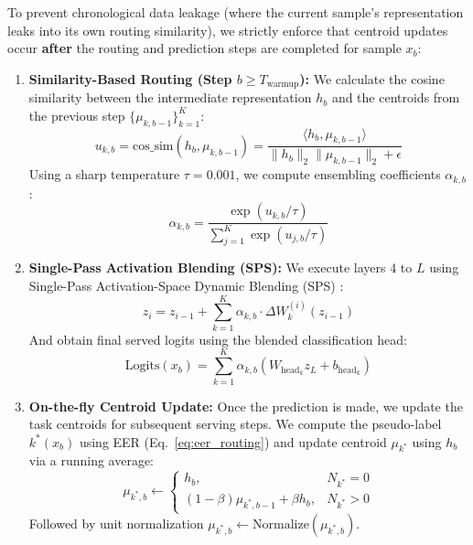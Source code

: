 To prevent chronological data leakage (where the current sample's representation leaks into its own routing similarity), we strictly enforce that centroid updates occur \textbf{after} the routing and prediction steps are completed for sample $x_b$:
\begin{enumerate}
    \item \textbf{Similarity-Based Routing (Step $b \ge T_{\text{warmup}}$):} We calculate the cosine similarity between the intermediate representation $h_b$ and the centroids from the previous step $\{\mu_{k, b-1}\}_{k=1}^K$:
    \begin{equation}
    u_{k, b} = \text{cos\_sim}(h_b, \mu_{k, b-1}) = \frac{\langle h_b, \mu_{k, b-1} \rangle}{\|h_b\|_2 \|\mu_{k, b-1}\|_2 + \epsilon}
    \label{eq:epl_cos_sim}
    \end{equation}
    Using a sharp temperature $\tau = 0.001$, we compute ensembling coefficients $\alpha_{k, b}$:
    \begin{equation}
    \alpha_{k, b} = \frac{\exp(u_{k, b} / \tau)}{\sum_{j=1}^K \exp(u_{j, b} / \tau)}
    \label{eq:epl_soft_routing}
    \end{equation}
    \item \textbf{Single-Pass Activation Blending (SPS):} We execute layers 4 to $L$ using Single-Pass Activation-Space Dynamic Blending (SPS) \cite{sps_zca}:
    \begin{equation}
    z_i = z_{i-1} + \sum_{k=1}^K \alpha_{k, b} \cdot \Delta W_k^{(i)}(z_{i-1})
    \label{eq:epl_sps}
    \end{equation}
    And obtain final served logits using the blended classification head:
    \begin{equation}
    \text{Logits}(x_b) = \sum_{k=1}^K \alpha_{k, b} \left( W_{\text{head}_k} z_L + b_{\text{head}_k} \right)
    \label{eq:blended_head}
    \end{equation}
    \item \textbf{On-the-fly Centroid Update:} Once the prediction is made, we update the task centroids for subsequent serving steps. We compute the pseudo-label $k^*(x_b)$ using EER (Eq.~\ref{eq:eer_routing}) and update centroid $\mu_{k^*}$ using $h_b$ via a running average:
    \begin{equation}
    \mu_{k^*, b} \leftarrow 
    \begin{cases} 
    h_b, & N_{k^*} = 0 \\
    (1 - \beta)\mu_{k^*, b-1} + \beta h_b, & N_{k^*} > 0
    \end{cases}
    \label{eq:epl_centroid_update}
    \end{equation}
    Followed by unit normalization $\mu_{k^*, b} \leftarrow \text{Normalize}(\mu_{k^*, b})$.
\end{enumerate}
